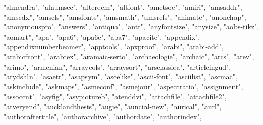 \documentclass[
]{article}
\newenvironment{Shaded}{\begin{snugshade}}{\end{snugshade}}
\newcommand{\NormalTok}[1]{#1}
\newcommand{\StringTok}[1]{\textcolor[rgb]{0.31,0.60,0.02}{#1}}
\begin{document}
\begin{Shaded}
\begin{Highlighting}[]
\StringTok{"almendra"}\NormalTok{, }\StringTok{"alnumsec"}\NormalTok{, }\StringTok{"alterqcm"}\NormalTok{, }\StringTok{"altfont"}\NormalTok{, }\StringTok{"ametsoc"}\NormalTok{, }\StringTok{"amiri"}\NormalTok{, }
\StringTok{"amsaddr"}\NormalTok{, }\StringTok{"amscdx"}\NormalTok{, }\StringTok{"amscls"}\NormalTok{, }\StringTok{"amsfonts"}\NormalTok{, }\StringTok{"amsmath"}\NormalTok{, }\StringTok{"amsrefs"}\NormalTok{, }
\StringTok{"animate"}\NormalTok{, }\StringTok{"anonchap"}\NormalTok{, }\StringTok{"anonymouspro"}\NormalTok{, }\StringTok{"answers"}\NormalTok{, }\StringTok{"antiqua"}\NormalTok{, }
\StringTok{"antt"}\NormalTok{, }\StringTok{"anyfontsize"}\NormalTok{, }\StringTok{"anysize"}\NormalTok{, }\StringTok{"aobs{-}tikz"}\NormalTok{, }\StringTok{"aomart"}\NormalTok{, }\StringTok{"apa"}\NormalTok{, }
\StringTok{"apa6"}\NormalTok{, }\StringTok{"apa6e"}\NormalTok{, }\StringTok{"apa7"}\NormalTok{, }\StringTok{"apacite"}\NormalTok{, }\StringTok{"appendix"}\NormalTok{, }\StringTok{"appendixnumberbeamer"}\NormalTok{, }
\StringTok{"apptools"}\NormalTok{, }\StringTok{"apxproof"}\NormalTok{, }\StringTok{"arabi"}\NormalTok{, }\StringTok{"arabi{-}add"}\NormalTok{, }\StringTok{"arabicfront"}\NormalTok{, }
\StringTok{"arabtex"}\NormalTok{, }\StringTok{"aramaic{-}serto"}\NormalTok{, }\StringTok{"archaeologie"}\NormalTok{, }\StringTok{"archaic"}\NormalTok{, }\StringTok{"arcs"}\NormalTok{, }
\StringTok{"arev"}\NormalTok{, }\StringTok{"arimo"}\NormalTok{, }\StringTok{"armenian"}\NormalTok{, }\StringTok{"arraycols"}\NormalTok{, }\StringTok{"arraysort"}\NormalTok{, }\StringTok{"arsclassica"}\NormalTok{, }
\StringTok{"articleingud"}\NormalTok{, }\StringTok{"arydshln"}\NormalTok{, }\StringTok{"asaetr"}\NormalTok{, }\StringTok{"asapsym"}\NormalTok{, }\StringTok{"ascelike"}\NormalTok{, }
\StringTok{"ascii{-}font"}\NormalTok{, }\StringTok{"asciilist"}\NormalTok{, }\StringTok{"ascmac"}\NormalTok{, }\StringTok{"askinclude"}\NormalTok{, }\StringTok{"askmaps"}\NormalTok{, }
\StringTok{"asmeconf"}\NormalTok{, }\StringTok{"asmejour"}\NormalTok{, }\StringTok{"aspectratio"}\NormalTok{, }\StringTok{"assignment"}\NormalTok{, }\StringTok{"assoccnt"}\NormalTok{, }
\StringTok{"asyfig"}\NormalTok{, }\StringTok{"asypictureb"}\NormalTok{, }\StringTok{"atenddvi"}\NormalTok{, }\StringTok{"attachfile"}\NormalTok{, }\StringTok{"attachfile2"}\NormalTok{, }
\StringTok{"atveryend"}\NormalTok{, }\StringTok{"aucklandthesis"}\NormalTok{, }\StringTok{"augie"}\NormalTok{, }\StringTok{"auncial{-}new"}\NormalTok{, }\StringTok{"aurical"}\NormalTok{, }
\StringTok{"aurl"}\NormalTok{, }\StringTok{"authoraftertitle"}\NormalTok{, }\StringTok{"authorarchive"}\NormalTok{, }\StringTok{"authordate"}\NormalTok{, }\StringTok{"authorindex"}\NormalTok{, }

\end{Highlighting}
\end{Shaded}
\end{document}
